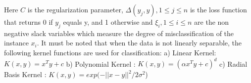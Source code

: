 \documentclass{sig-alternate}
\begin{document}
\begin{enumerate}
Here $C$ is the regularization parameter, $\Delta(y_{j},y), 1 \le j \le n$ is the loss function that returns 0 if $y_{j}$ equals y, and 1 otherwise and $\xi_{i}, 1 \le i \le n$ are the non negative slack variables which measure the degree of misclassification of the instance $x_{i}$. 
It must be noted that when the data is not linearly separable, the following kernel functions are used for classification:
a) Linear Kernel: $K(x,y) = x^{T}y + c $
b) Polynomial Kernel : $K(x,y) = (\alpha x^{T}y + c)^{d}$
c) Radial Basis Kernel : $K(x,y) = exp(-\lvert \lvert x-y\rvert\rvert^{2}/2\sigma^{2}$)



\end{enumerate}
\end{document}
